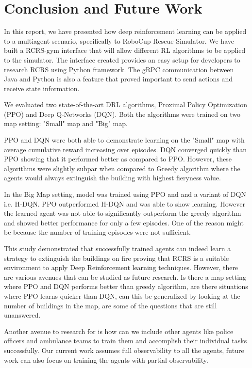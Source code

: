 \documentclass[12pt]{report}
\begin{document}
\chapter{Conclusion and Future Work}

In this report, we have presented how deep reinforcement learning can be applied to a multiagent scenario, specifically to RoboCup Rescue Simulator. We have built a RCRS-gym interface that will allow different RL algorithms to be applied to the simulator. The interface created provides an easy setup for developers to research RCRS using Python framework. The gRPC communication between Java and Python is also a feature that proved important to send actions and receive state information. 

We evaluated two state-of-the-art DRL algorithms, Proximal Policy Optimization (PPO) and Deep Q-Networks (DQN). Both the algorithms were trained on two map setting: "Small" map and "Big" map. 

PPO and DQN were both able to demonstrate learning on the "Small" map with average cumulative reward increasing over episodes. DQN converged quickly than PPO showing that it performed better as compared to PPO. However, these algorithms were slightly subpar when compared to Greedy algorithm where the agents would always extinguish the building with highest fieryness value. 

In the Big Map setting, model was trained using PPO and and a variant of DQN i.e. H-DQN. PPO outperformed H-DQN and was able to show learning. However the learned agent was not able to significantly outperform the greedy algorithm and showed better performance for only a few episodes. One of the reason might be because the number of training episodes were not sufficient. 

This study demonstrated that successfully trained agents can indeed learn a strategy to extinguish the buildings on fire proving that RCRS is a suitable environment to apply Deep Reinforcement learning techniques. However, there are various avenues that can be studied as future research. Is there a map setting where PPO and DQN performs better than greedy algorithm, are there situations where PPO learns quicker than DQN, can this be generalized by looking at the number of buildings in the map, are some of the questions that are still unanswered. 

Another avenue to research for is how can we include other agents like police officers and ambulance teams to train them and accomplish their individual tasks successfully. Our current work assumes full observability to all the agents, future work can also focus on training the agents with partial observability. 




      
\end{document}
